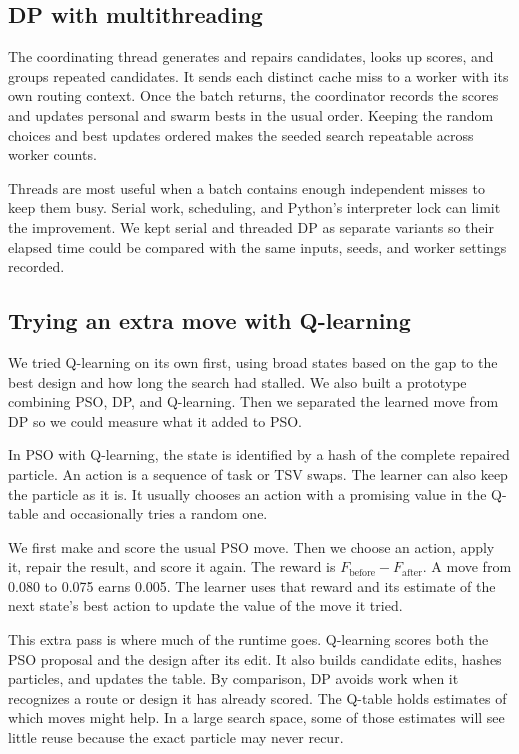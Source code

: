 \documentclass[12pt,a4paper]{article}
\begin{document}
\subsection{DP with multithreading}

The coordinating thread generates and repairs candidates, looks up scores, and groups repeated candidates. It sends each distinct cache miss to a worker with its own routing context. Once the batch returns, the coordinator records the scores and updates personal and swarm bests in the usual order. Keeping the random choices and best updates ordered makes the seeded search repeatable across worker counts.

Threads are most useful when a batch contains enough independent misses to keep them busy. Serial work, scheduling, and Python's interpreter lock can limit the improvement. We kept serial and threaded DP as separate variants so their elapsed time could be compared with the same inputs, seeds, and worker settings recorded.


\clearpage
\subsection{Trying an extra move with Q-learning}

We tried Q-learning on its own first, using broad states based on the gap to the best design and how long the search had stalled. We also built a prototype combining PSO, DP, and Q-learning. Then we separated the learned move from DP so we could measure what it added to PSO.

In PSO with Q-learning, the state is identified by a hash of the complete repaired particle. An action is a sequence of task or TSV swaps. The learner can also keep the particle as it is. It usually chooses an action with a promising value in the Q-table and occasionally tries a random one.

We first make and score the usual PSO move. Then we choose an action, apply it, repair the result, and score it again. The reward is \(F_{\mathrm{before}}-F_{\mathrm{after}}\). A move from 0.080 to 0.075 earns 0.005. The learner uses that reward and its estimate of the next state's best action to update the value of the move it tried.

This extra pass is where much of the runtime goes. Q-learning scores both the PSO proposal and the design after its edit. It also builds candidate edits, hashes particles, and updates the table. By comparison, DP avoids work when it recognizes a route or design it has already scored. The Q-table holds estimates of which moves might help. In a large search space, some of those estimates will see little reuse because the exact particle may never recur.
\end{document}
